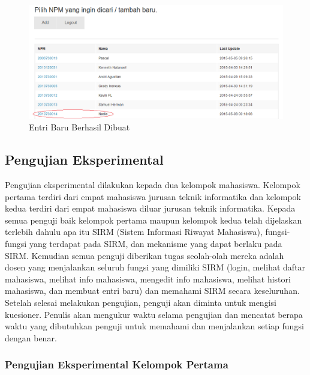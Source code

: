 \begin{figure}[H]
\centering
\includegraphics[scale=0.5]{Gambar/pengujian16.png}
\caption[Entri Baru Berhasil Dibuat]{Entri Baru Berhasil Dibuat} 
\label{fig:entribaruberhasil}
\end{figure}

\subsection{Pengujian Eksperimental}
\label{sec:pengujianeksperimantal}

Pengujian eksperimental dilakukan kepada dua kelompok mahasiswa. Kelompok
pertama terdiri dari empat mahasiswa jurusan teknik informatika dan kelompok
kedua terdiri dari empat mahasiswa diluar jurusan teknik informatika. Kepada
semua penguji baik kelompok pertama maupun kelompok kedua telah dijelaskan terlebih
dahulu apa itu SIRM (Sistem Informasi Riwayat Mahasiswa), fungsi-fungsi yang
terdapat pada SIRM, dan mekanisme yang dapat berlaku pada SIRM. Kemudian semua
penguji diberikan tugas seolah-olah mereka adalah dosen yang menjalankan seluruh
fungsi yang dimiliki SIRM (login, melihat daftar mahasiswa, melihat info mahasiswa,
mengedit info mahasiswa, melihat histori mahasiswa, dan membuat entri baru) dan
memahami SIRM secara keseluruhan. Setelah selesai melakukan pengujian, penguji
akan diminta untuk mengisi kuesioner. Penulis akan mengukur waktu selama
pengujian dan mencatat berapa waktu yang dibutuhkan penguji untuk memahami dan
menjalankan setiap fungsi dengan benar.

\subsubsection{Pengujian Eksperimental Kelompok Pertama}
\label{kelompokpertama}

